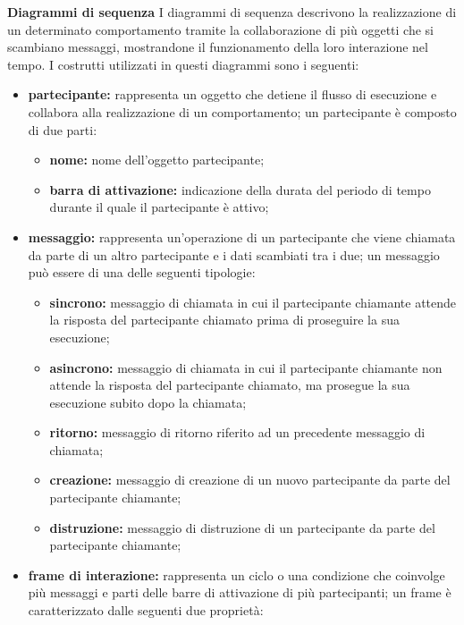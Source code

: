 						\textbf{Diagrammi di sequenza}
						\newline
						\newline
						\hangindent=0.6cm I diagrammi di sequenza descrivono la realizzazione di un determinato comportamento tramite la collaborazione di più oggetti che si scambiano messaggi, mostrandone il funzionamento della loro interazione nel tempo.
						\newline
						\hangindent=0.6cm I costrutti utilizzati in questi diagrammi sono i seguenti:
						\begin{itemize}[leftmargin=1.5cm]
							\item \textbf{partecipante:} rappresenta un oggetto che detiene il flusso di esecuzione e collabora alla realizzazione di un comportamento; un partecipante è composto di due parti:
							\begin{itemize}
								\item \textbf{nome:} nome dell'oggetto partecipante;
								\item \textbf{barra di attivazione:} indicazione della durata del periodo di tempo durante il quale il partecipante è attivo;
							\end{itemize}
							\item \textbf{messaggio:} rappresenta un'operazione di un partecipante che viene chiamata da parte di un altro partecipante e i dati scambiati tra i due; un messaggio può essere di una delle seguenti tipologie:
							\begin{itemize}
								\item \textbf{sincrono:} messaggio di chiamata in cui il partecipante chiamante attende la risposta del partecipante chiamato prima di proseguire la sua esecuzione;
								\item \textbf{asincrono:} messaggio di chiamata in cui il partecipante chiamante non attende la risposta del partecipante chiamato, ma prosegue la sua esecuzione subito dopo la chiamata;
								\item \textbf{ritorno:} messaggio di ritorno riferito ad un precedente messaggio di chiamata;
								\item \textbf{creazione:} messaggio di creazione di un nuovo partecipante da parte del partecipante chiamante;
								\item \textbf{distruzione:} messaggio di distruzione di un partecipante da parte del partecipante chiamante;
							\end{itemize}
							\item \textbf{frame di interazione:} rappresenta un ciclo o una condizione che coinvolge più messaggi e parti delle barre di attivazione di più partecipanti; un frame è caratterizzato dalle seguenti due proprietà:

\end{itemize}
